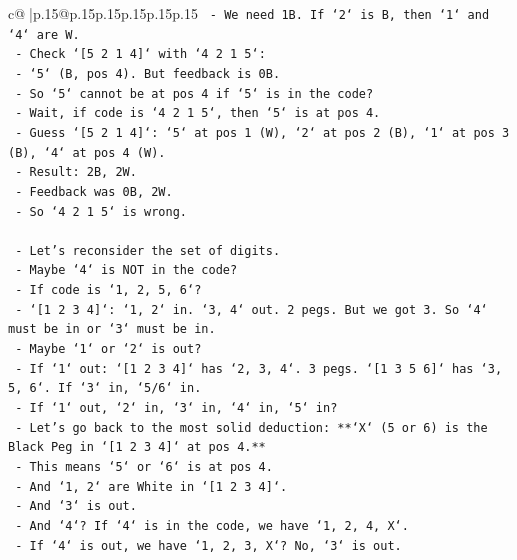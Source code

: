 \documentclass{article}
\begin{document}
{\begin{supertabular}{c@{$\;$}|p{.15\linewidth}@{}p{.15\linewidth}p{.15\linewidth}p{.15\linewidth}p{.15\linewidth}p{.15\linewidth}}
{{{\texttt{                        {-} We need 1B. If `2` is B, then `1` and `4` are W.} \\
\texttt{                        {-} Check `{[}5 2 1 4{]}` with `4 2 1 5`:} \\
\texttt{                            {-} `5` (B, pos 4). But feedback is 0B.} \\
\texttt{                            {-} So `5` cannot be at pos 4 if `5` is in the code?} \\
\texttt{                            {-} Wait, if code is `4 2 1 5`, then `5` is at pos 4.} \\
\texttt{                            {-} Guess `{[}5 2 1 4{]}`: `5` at pos 1 (W), `2` at pos 2 (B), `1` at pos 3 (B), `4` at pos 4 (W).} \\
\texttt{                            {-} Result: 2B, 2W.} \\
\texttt{                            {-} Feedback was 0B, 2W.} \\
\texttt{                            {-} So `4 2 1 5` is wrong.} \\
\\ 
\texttt{    {-} Let's reconsider the set of digits.} \\
\texttt{    {-} Maybe `4` is NOT in the code?} \\
\texttt{    {-} If code is `1, 2, 5, 6`?} \\
\texttt{        {-} `{[}1 2 3 4{]}`: `1, 2` in. `3, 4` out. 2 pegs. But we got 3. So `4` must be in or `3` must be in.} \\
\texttt{    {-} Maybe `1` or `2` is out?} \\
\texttt{        {-} If `1` out: `{[}1 2 3 4{]}` has `2, 3, 4`. 3 pegs. `{[}1 3 5 6{]}` has `3, 5, 6`. If `3` in, `5/6` in.} \\
\texttt{        {-} If `1` out, `2` in, `3` in, `4` in, `5` in?} \\
\texttt{        {-} Let's go back to the most solid deduction: **`X` (5 or 6) is the Black Peg in `{[}1 2 3 4{]}` at pos 4.**} \\
\texttt{        {-} This means `5` or `6` is at pos 4.} \\
\texttt{        {-} And `1, 2` are White in `{[}1 2 3 4{]}`.} \\
\texttt{        {-} And `3` is out.} \\
\texttt{        {-} And `4`? If `4` is in the code, we have `1, 2, 4, X`.} \\
\texttt{        {-} If `4` is out, we have `1, 2, 3, X`? No, `3` is out.} \\
}}}
\end{supertabular}}
\end{document}
